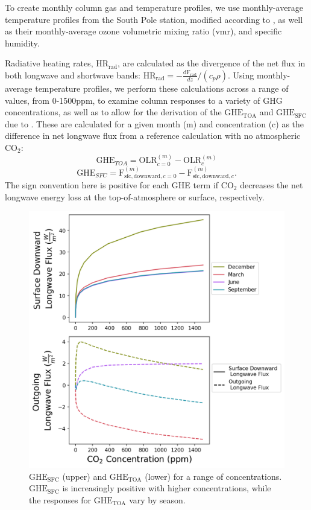 \documentclass[draft]{agujournal2019}
\begin{document}
To create monthly column gas and temperature profiles, we use monthly-average temperature profiles from the South Pole station, modified according to , as well as their monthly-average ozone volumetric mixing ratio (vmr), and specific humidity. 

Radiative heating rates, $\text{HR}_{\text{rad}}$, are calculated as the divergence of the net flux in both longwave and shortwave bands: $\text{HR}_{\text{rad}} = -\frac{\text{dF}_{\text{rad}}}{dz} /(c_p \rho) $. Using monthly-average temperature profiles, we perform these calculations across a range of  values, from 0-1500ppm, to examine column responses to a variety of GHG concentrations, as well as to allow for the derivation of the $\text{GHE}_\text{{TOA}}$ and $\text{GHE}_{\text{SFC}}$ due to . These are calculated for a given month (m) and  concentration (c) as the difference in net longwave flux from a reference calculation with no atmospheric CO$_2$: 
\begin{equation}
    {\text{GHE}_{TOA}} = \text{OLR}_{c=0}^{(m)} - \text{OLR}_{c}^{(m)}
\end{equation}
\begin{equation}
    {\text{GHE}_{SFC}} = \text{F}_{\text{sfc}, \text{downward}, c=0}^{(m)} - \text{F}_{\text{sfc}, \text{downward}, c}^{(m)}.
\end{equation}
The sign convention here is positive for each GHE term if CO$_2$ decreases the net longwave energy loss at the top-of-atmosphere or surface, respectively.

\begin{figure}[htb!]
\noindent\includegraphics[width=1\textwidth]{figures/GH_sfc_CO2_effect.png}
\centering
\caption{$\text{GHE}_{\text{SFC}}$ (upper) and $\text{GHE}_{\text{TOA}}$ (lower) for a range of  concentrations. $\text{GHE}_{\text{SFC}}$ is increasingly positive with higher  concentrations, while the responses for $\text{GHE}_{\text{TOA}}$ vary by season.}
\label{fig:sfc_toa_GHE}
\end{figure}
\end{document}
